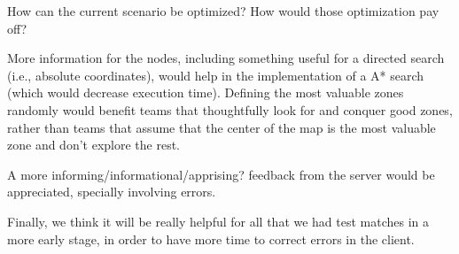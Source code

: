 \begin{question}
How can the current scenario be optimized? How would those optimization pay
off?
\end{question}

    More information for the nodes, including something useful for a directed
    search (i.e., absolute coordinates), would help in
    the implementation of a A* search (which would decrease execution time).
    Defining the most valuable zones randomly would benefit teams that
    thoughtfully look for and conquer good zones, rather than teams that assume
    that the center of the map is the most valuable zone and don't explore the
    rest.

    A more informing/informational/apprising? feedback from the server would
    be appreciated, specially involving errors.

    Finally, we think it will be really helpful for all that we had test
    matches in a more early stage, in order to have more time to correct
    errors in the client.
